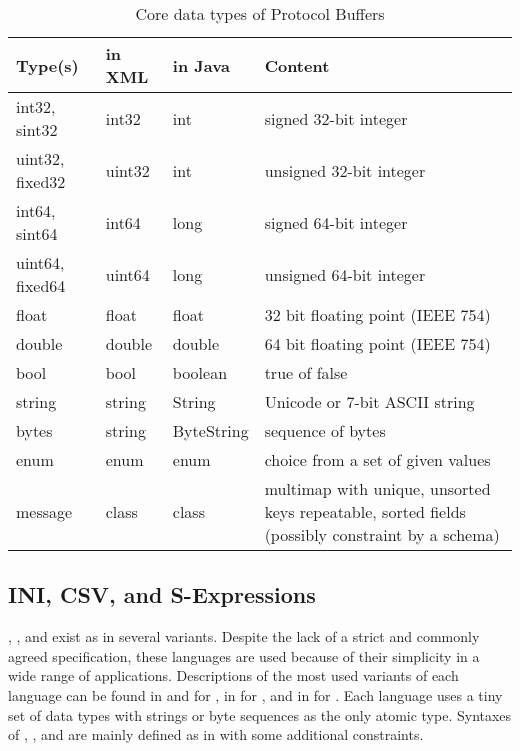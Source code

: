 \begin{table}[h]
  \centering
  \begin{tabularx}{\linewidth}{|l|l|l|X|}
    \hline
    \textbf{Type(s)} & \textbf{in XML} & \textbf{in Java} & \textbf{Content} \\
    \hline
    int32, sint32 & int32 & int & signed 32-bit integer \\
    \hline
    uint32, fixed32 & uint32 & int & unsigned 32-bit integer \\
    \hline
    int64, sint64 & int64  & long & signed 64-bit integer \\
    \hline
    uint64, fixed64 & uint64 & long & unsigned 64-bit integer \\
    \hline
    float & float & float & 32 bit floating point (IEEE 754) \\
    \hline
    double & double & double & 64 bit floating point (IEEE 754) \\
    \hline
    bool & bool & boolean & true of false \\
    \hline
    string & string & String & Unicode or 7-bit ASCII string \\
    \hline
    bytes & string & ByteString & sequence of bytes \\
    \hline
    enum & enum & enum & choice from a set of given values \\
    \hline
    message & class & class & multimap with unique, unsorted keys
       repeatable, sorted fields (possibly constraint by a schema) \\
    \hline
\end{tabularx}
\caption{Core data types of Protocol Buffers}
\label{tab:protocolbuffersdatatypes}
\end{table}


\subsection{INI, CSV, and S-Expressions}
\label{sec:csvandini}

, , 
and  exist as  in several variants.
Despite the lack of a strict and commonly agreed specification, these 
languages are used because of their simplicity in a wide range of
applications. Descriptions of the most used variants of each language
can be found in \textcite{RFC4180} and \textcite{Repici2010} for ,
in \textcite{WP:INI} for , and in \textcite{Rivest1997} for
. Each language uses a tiny set of data types with strings or 
byte sequences as the only atomic type. Syntaxes of , ,
and  are mainly defined as  in 
 with some additional constraints.

